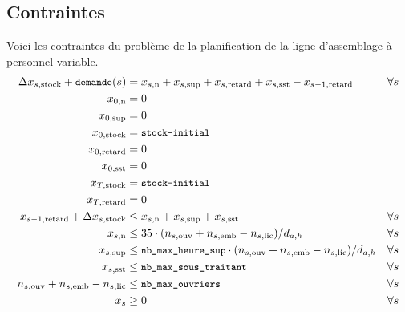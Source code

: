 \subsection*{Contraintes}
Voici les contraintes du problème de la planification 
de la ligne d’assemblage à personnel variable.
\begin{align*}
  \Delta x_{s,\text{stock}} + {\small\texttt{demande}}(s) &= x_{s,\text{n}} + x_{s,\text{sup}} 
  + x_{s,\text{retard}} + x_{s,\text{sst}} - x_{s-1,\text{retard}} &\forall s \\
  x_{0,\text{n}}&= 0 \\
  x_{0,\text{sup}}&= 0 \\
  x_{0,\text{stock}} &= {\small\texttt{stock-initial}} \\
  x_{0,\text{retard}}&= 0 \\
  x_{0,\text{sst}}&= 0 \\
  x_{T,\text{stock}} &= {\small\texttt{stock-initial}} \\
  x_{T,\text{retard}}&= 0 \\
  x_{s-1,\text{retard}} + \Delta x_{s,\text{stock}} &\leq x_{s,\text{n}} + x_{s,\text{sup}} + x_{s,\text{sst}} &\forall s \\
  x_{s,\text{n}} &\leq 35\cdot (n_{s,\text{ouv}} + n_{s,\text{emb}} - n_{s,\text{lic}})/ d_{a,h}
  &\forall s \\
  x_{s,\text{sup}} &\leq {\small\texttt{nb\_max\_heure\_sup}}\cdot (n_{s,\text{ouv}} + n_{s,\text{emb}} - n_{s,\text{lic}})/ d_{a,h}
  &\forall s \\
  x_{s,\text{sst}} &\leq {\small\texttt{nb\_max\_sous\_traitant}} &\forall s \\
  n_{s,\text{ouv}} + n_{s,\text{emb}} - n_{s,\text{lic}} &\leq {\small\texttt{nb\_max\_ouvriers}}  &\forall s \\
  x_s &\geq 0 &\forall s
\end{align*}
